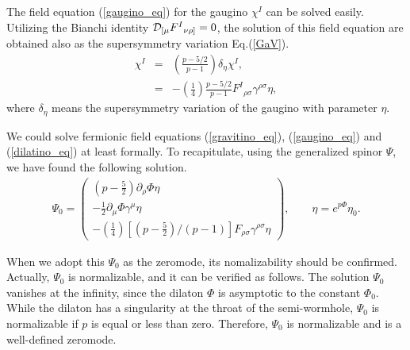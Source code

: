\documentclass[a4paper,aps, amssymb, preprint, 12pt]{revtex4}
\begin{document}
The field equation (\ref{gaugino_eq}) for the gaugino $\chi^I$ can be solved easily.
Utilizing the Bianchi identity ${\cal D}_{[\mu}{F^I}_{\nu\rho]}=0$, the solution of this field equation are obtained also as the supersymmetry variation Eq.(\ref{GaV}).
\begin{eqnarray}
\chi^I &=& \left(\frac{p-5/2}{p-1}\right)\delta_{\eta}\chi^I, \nonumber \\
      &=& -\left(\frac{1}{4}\right)\frac{p-5/2}{p-1}{F^I}_{\rho\sigma}\gamma^{\rho\sigma}\eta,
\end{eqnarray}
where $\delta_{\eta}$ means the supersymmetry variation of the gaugino with parameter $\eta$.

We could solve fermionic field equations (\ref{gravitino_eq}), (\ref{gaugino_eq}) and  (\ref{dilatino_eq}) at least formally.
To recapitulate, using the generalized spinor $\Psi$, we have found the following solution.
\begin{eqnarray}
\Psi_0 =
\left(\begin{array}{c}
\left(p-\frac{5}{2}\right)\partial_\rho\Phi\eta \\
-\frac{1}{2}\partial_\mu\Phi\gamma^\mu\eta \\
-\left(\frac{1}{4}\right)\left[\left(p-\frac{5}{2}\right)/\left(p-1\right)\right]F_{\rho\sigma}\gamma^{\rho\sigma}\eta
\end{array}
\right), 
\qquad \eta = e^{p\Phi}\eta_0. \label{zeromode}
\end{eqnarray}

When we adopt this $\Psi_0$ as the zeromode, its nomalizability should be confirmed.
Actually, $\Psi_0$ is normalizable, and it can be verified as follows.
The solution $\Psi_0$ vanishes at the infinity, since the dilaton $\Phi$ is asymptotic to the constant $\Phi_0$.
While the dilaton has a singularity at the throat of the semi-wormhole, $\Psi_0$ is normalizable if $p$ is equal or less than zero.
Therefore, $\Psi_0$ is normalizable and is a well-defined zeromode.
\end{document}
